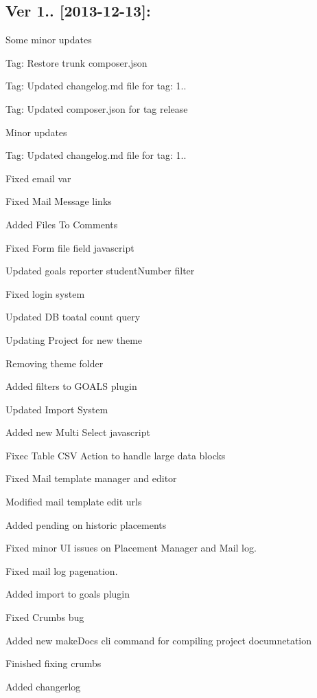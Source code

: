 \subsection*{Ver 1.. \mbox{[}2013-\/12-\/13\mbox{]}\+: }


\begin{DoxyItemize}
\item Some minor updates
\item Tag\+: Restore trunk composer.\+json
\item Tag\+: Updated changelog.\+md file for tag\+: 1..
\item Tag\+: Updated composer.\+json for tag release
\item Minor updates
\item Tag\+: Updated changelog.\+md file for tag\+: 1..
\item Fixed email var
\item Fixed Mail Message links
\item Added Files To Comments
\item Fixed Form file field javascript
\item Updated goals reporter student\+Number filter
\item Fixed login system
\item Updated D\+B toatal count query
\item Updating Project for new theme
\item Removing theme folder
\item Added filters to G\+O\+A\+L\+S plugin
\item Updated Import System
\item Added new Multi Select javascript
\item Fixec Table C\+S\+V Action to handle large data blocks
\item Fixed Mail template manager and editor
\item Modified mail template edit urls
\item Added pending on historic placements
\item Fixed minor U\+I issues on Placement Manager and Mail log.
\item Fixed mail log pagenation.
\item Added import to goals plugin
\item Fixed Crumbs bug
\item Added new make\+Docs cli command for compiling project documnetation
\item Finished fixing crumbs
\item Added changerlog
\end{DoxyItemize}

